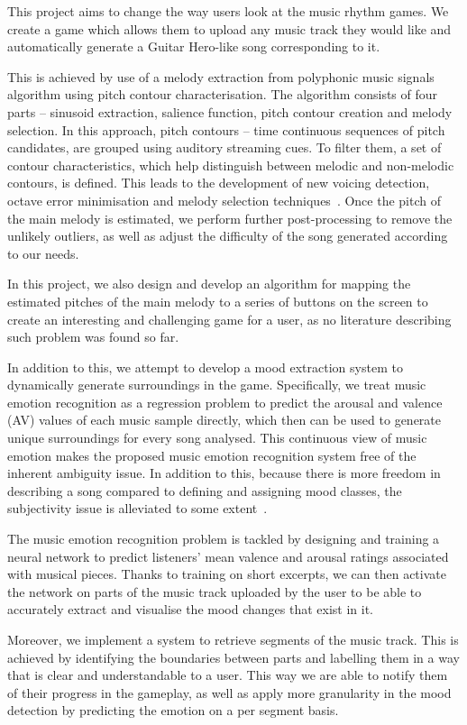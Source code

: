 This project aims to change the way users look at the music rhythm games. We create a game which allows them to upload any music track they would like and automatically generate a Guitar Hero-like song corresponding to it. 

This is achieved by use of a melody extraction from polyphonic music signals algorithm using pitch contour characterisation. The algorithm consists of four parts -- sinusoid extraction, salience function, pitch contour creation and melody selection. In this approach, pitch contours -- time continuous sequences of pitch candidates, are grouped using auditory streaming cues. To filter them, a set of contour characteristics, which help distinguish between melodic and non-melodic contours, is defined. This leads to the development of new voicing detection, octave error minimisation and melody selection techniques~\cite{salamon}. Once the pitch of the main melody is estimated, we perform further post-processing to remove the unlikely outliers, as well as adjust the difficulty of the song generated according to our needs.

In this project, we also design and develop an algorithm for mapping the estimated pitches of the main melody to a series of buttons on the screen to create an interesting and challenging game for a user, as no literature describing such problem was found so far.

In addition to this, we attempt to develop a mood extraction system to dynamically generate surroundings in the game. Specifically, we treat music emotion recognition as a regression problem to predict the arousal and valence (AV) values of each music sample directly, which then can be used to generate unique surroundings for every song analysed. This continuous view of music emotion makes the proposed music emotion recognition system free of the inherent ambiguity issue. In addition to this, because there is more freedom in describing a song compared to defining and assigning mood classes, the subjectivity issue is alleviated to some extent~\cite{mood}.

The music emotion recognition problem is tackled by designing and training a neural network to predict listeners’ mean valence and arousal ratings associated with musical pieces. Thanks to training on short excerpts, we can then activate the network on parts of the music track uploaded by the user to be able to accurately extract and visualise the mood changes that exist in it.

Moreover, we implement a system to retrieve segments of the music track. This is achieved by identifying the boundaries between parts and labelling them in a way that is clear and understandable to a user. This way we are able to notify them of their progress in the gameplay, as well as apply more granularity in the mood detection by predicting the emotion on a per segment basis.

